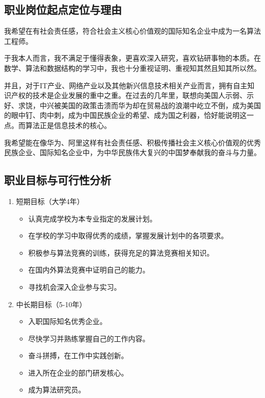 \documentclass{article}
\begin{document}
\subsection{职业岗位起点定位与理由}
我希望在有社会责任感，符合社会主义核心价值观的国际知名企业中成为一名算法工程师。\par
于我本人而言，我不满足于懂得表象，更喜欢深入研究，喜欢钻研事物的本质。在数学、算法和数据结构的学习中，我也十分重视证明、重视知其然且知其所以然。\par
并且，对于IT产业、网络产业以及其他新兴信息技术相关产业而言，拥有自主知识产权的技术是企业发展的重中之重。在过去的几年里，联想向美国人示弱、示好、求饶，中兴被美国的政策击溃而华为却在贸易战的浪潮中屹立不倒，成为美国的眼中钉、肉中刺，成为中国民族企业的希望、成为国之利器，恰好能说明这一点。而算法正是信息技术的核心。\par
我希望能在像华为、阿里这样有社会责任感、积极传播社会主义核心价值观的优秀民族企业、国际知名企业中，为中华民族伟大复兴的中国梦奉献我的奋斗与力量。
\subsection{职业目标与可行性分析}
\begin{enumerate}[(1)]
	\item {
		短期目标（大学4年）
		\begin{itemize}
			\item {认真完成学校为本专业指定的发展计划。}
			\item {在学校的学习中取得优秀的成绩，掌握发展计划中的各项要求。}
			\item {积极参与算法竞赛的训练，获得充足的算法竞赛相关知识。}
			\item {在国内外算法竞赛中证明自己的能力。}
			\item {寻找机会深入企业参与实习。}
		\end{itemize}
	}
	\item {
		中长期目标（5-10年）
		\begin{itemize}
			\item {入职国际知名优秀企业。}
			\item {尽快学习并熟练掌握自己的工作内容。}
			\item {奋斗拼搏，在工作中实践创新。}
			\item {进入所在企业的部门研发核心。}
			\item {成为算法研究员。}
		\end{itemize}
	}
\end{enumerate}
\end{document}
